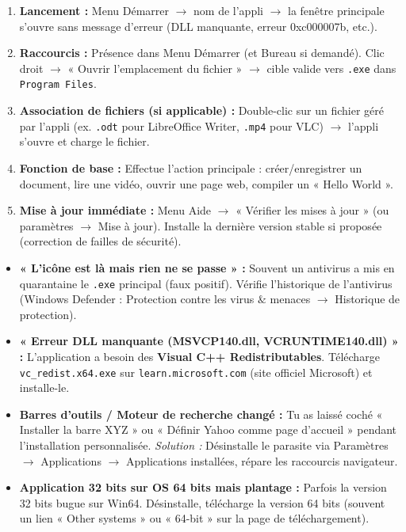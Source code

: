 \documentclass[11pt]{article}
\begin{document}
\begin{methode}
\begin{enumerate}
    \item \textbf{Lancement :} Menu Démarrer $\to$ nom de l'appli $\to$ la fenêtre principale s'ouvre sans message d'erreur (DLL manquante, erreur 0xc000007b, etc.).
    \item \textbf{Raccourcis :} Présence dans Menu Démarrer (et Bureau si demandé). Clic droit $\to$ « Ouvrir l'emplacement du fichier » $\to$ cible valide vers \texttt{.exe} dans \texttt{Program Files}.
    \item \textbf{Association de fichiers (si applicable) :} Double-clic sur un fichier géré par l'appli (ex. \texttt{.odt} pour LibreOffice Writer, \texttt{.mp4} pour VLC) $\to$ l'appli s'ouvre et charge le fichier.
    \item \textbf{Fonction de base :} Effectue l'action principale : créer/enregistrer un document, lire une vidéo, ouvrir une page web, compiler un « Hello World ».
    \item \textbf{Mise à jour immédiate :} Menu Aide $\to$ « Vérifier les mises à jour » (ou paramètres $\to$ Mise à jour). Installe la dernière version stable si proposée (correction de failles de sécurité).
\end{enumerate}
\end{methode}

\begin{attention}
\begin{itemize}
    \item \textbf{« L'icône est là mais rien ne se passe » :} Souvent un antivirus a mis en quarantaine le \texttt{.exe} principal (faux positif). Vérifie l'historique de l'antivirus (Windows Defender : Protection contre les virus $\&$ menaces $\to$ Historique de protection).
    \item \textbf{« Erreur DLL manquante (MSVCP140.dll, VCRUNTIME140.dll) » :} L'application a besoin des \textbf{Visual C++ Redistributables}. Télécharge \texttt{vc\_redist.x64.exe} sur \texttt{learn.microsoft.com} (site officiel Microsoft) et installe-le.
    \item \textbf{Barres d'outils / Moteur de recherche changé :} Tu as laissé coché « Installer la barre XYZ » ou « Définir Yahoo comme page d'accueil » pendant l'installation personnalisée. \emph{Solution :} Désinstalle le parasite via Paramètres $\to$ Applications $\to$ Applications installées, répare les raccourcis navigateur.
    \item \textbf{Application 32 bits sur OS 64 bits mais plantage :} Parfois la version 32 bits bugue sur Win64. Désinstalle, télécharge la version 64 bits (souvent un lien « Other systems » ou « 64-bit » sur la page de téléchargement).
\end{itemize}
\end{attention}
\end{document}
